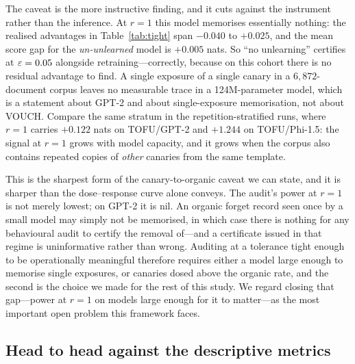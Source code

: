 The caveat is the more instructive finding, and it cuts against the instrument rather
than the inference. At $r = 1$ this model memorises essentially nothing: the realised
advantages in Table~\ref{tab:tight} span $-0.040$ to $+0.025$, and the mean score gap
for the \emph{un-unlearned} model is $+0.005$ nats. So ``no unlearning'' certifies at
$\varepsilon = 0.05$ alongside retraining---correctly, because on this cohort there is no
residual advantage to find. A single exposure of a single canary in a $6{,}872$-document
corpus leaves no measurable trace in a 124M-parameter model, which is a statement about
GPT-2 and about single-exposure memorisation, not about VOUCH. Compare the same
stratum in the repetition-stratified runs, where $r = 1$ carries $+0.122$ nats on
TOFU/GPT-2 and $+1.244$ on TOFU/Phi-1.5: the signal at $r=1$ grows with model
capacity, and it grows when the corpus also contains repeated copies of \emph{other}
canaries from the same template.

This is the sharpest form of the canary-to-organic caveat we can state, and it is
sharper than the dose--response curve alone conveys. The audit's power at $r = 1$ is
not merely lowest; on GPT-2 it is nil. An organic forget record seen once by a small
model may simply not be memorised, in which case there is nothing for any behavioural
audit to certify the removal of---and a certificate issued in that regime is
uninformative rather than wrong. Auditing at a tolerance tight enough to be
operationally meaningful therefore requires either a model large enough to memorise
single exposures, or canaries dosed above the organic rate, and the second is the
choice we made for the rest of this study. We regard closing that gap---power at
$r = 1$ on models large enough for it to matter---as the most important open problem
this framework faces.

\begin{table}[t]
\centering\small
\caption{Tight-tolerance cohort: TOFU/GPT-2, $3{,}072$ canary pairs, every canary
inserted once ($r = 1$), $2$ seeds, $22.5\%$ canary character share. The
super-population target reaches $\eps = 0.1$ here, which it does not at the
$384$--$640$-pair cohorts of Table~\ref{tab:epssweep}. At $r = 1$ this model memorises
so little that the un-unlearned model also certifies: $\hat\Delta$ is the realised
cohort advantage per seed.}
\label{tab:tight}

\end{table}

\subsection{Head to head against the descriptive metrics}\label{sec:exp-descriptive}

